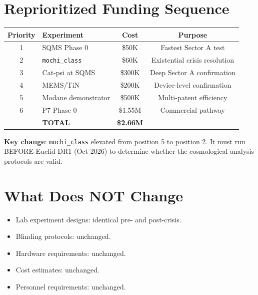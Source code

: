 \documentclass[11pt]{article}
\begin{document}
\section{Reprioritized Funding Sequence}

\begin{table}[h]
\centering
\begin{tabular}{clcc}
\toprule
\textbf{Priority} & \textbf{Experiment} & \textbf{Cost} & \textbf{Purpose} \\
\midrule
1 & SQMS Phase 0 & \$50K & Fastest Sector A test \\
2 & \texttt{mochi\_class} & \$60K & Existential crisis resolution \\
3 & Cat-psi at SQMS & \$300K & Deep Sector A confirmation \\
4 & MEMS/TiN & \$200K & Device-level confirmation \\
5 & Modane demonstrator & \$500K & Multi-patent efficiency \\
6 & P7 Phase 0 & \$1.55M & Commercial pathway \\
\midrule
& \textbf{TOTAL} & \textbf{\$2.66M} & \\
\bottomrule
\end{tabular}
\end{table}

\textbf{Key change}: \texttt{mochi\_class} elevated from position 5 to
position 2. It must run BEFORE Euclid DR1 (Oct 2026) to determine whether
the cosmological analysis protocols are valid.

\section{What Does NOT Change}

\begin{itemize}
\item Lab experiment designs: identical pre- and post-crisis.
\item Blinding protocols: unchanged.
\item Hardware requirements: unchanged.
\item Cost estimates: unchanged.
\item Personnel requirements: unchanged.
\end{itemize}
\end{document}

